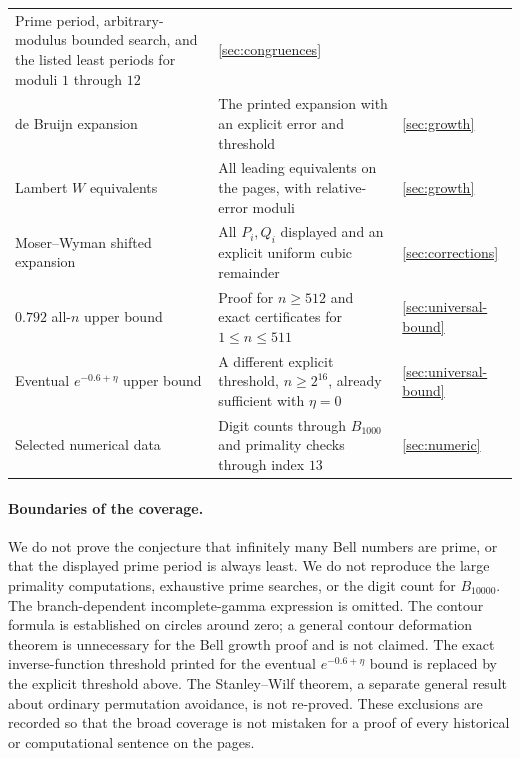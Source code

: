 \documentclass[11pt]{article}
\theoremstyle{definition}
\theoremstyle{remark}
\numberwithin{equation}{section}
\begin{document}
\begin{longtable}{@{}>{\raggedright\arraybackslash}p{}>{\raggedright\arraybackslash}p{}p{}@{}}
Prime period, arbitrary-modulus bounded search, and the listed least periods
for moduli $1$ through $12$ & \ref{sec:congruences}\\
de Bruijn expansion &
The printed expansion with an explicit error and threshold & \ref{sec:growth}\\
Lambert $W$ equivalents &
All leading equivalents on the pages, with relative-error moduli & \ref{sec:growth}\\
Moser--Wyman shifted expansion &
All $P_i,Q_i$ displayed and an explicit uniform cubic remainder & \ref{sec:corrections}\\
$0.792$ all-$n$ upper bound &
Proof for $n\ge512$ and exact certificates for $1\le n\le511$ & \ref{sec:universal-bound}\\
Eventual $e^{-0.6+\eta}$ upper bound &
A different explicit threshold, $n\ge2^{16}$, already sufficient with
$\eta=0$ & \ref{sec:universal-bound}\\
Selected numerical data &
Digit counts through $B_{1000}$ and primality checks through index $13$ &
\ref{sec:numeric}\\
\bottomrule
\end{longtable}
\normalsize

\paragraph{Boundaries of the coverage.}
We do not prove the conjecture that infinitely many Bell numbers are prime,
or that the displayed prime period is always least. We do not reproduce the
large primality computations, exhaustive prime searches, or the digit count
for $B_{10000}$. The branch-dependent incomplete-gamma expression is omitted.
The contour formula is established on circles around zero; a general contour
deformation theorem is unnecessary for the Bell growth proof and is not
claimed. The exact inverse-function threshold printed for the eventual
$e^{-0.6+\eta}$ bound is replaced by the explicit threshold above. The
Stanley--Wilf theorem, a separate general result about ordinary permutation
avoidance, is not re-proved. These exclusions are recorded so that the broad
coverage is not mistaken for a proof of every historical or computational
sentence on the pages.











\end{document}
